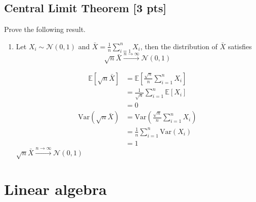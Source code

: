 \documentclass[a4paper]{article}
\theoremstyle{definition}
\newcommand{\Var}{\mathrm{Var}}
\newenvironment{soln}{
	\leavevmode\color{blue}\ignorespaces
}{}
\begin{document}
	\subsection{Central Limit Theorem [3 pts]}
	Prove the following result.
	\begin{enumerate}
		\item Let $X_i\sim\mathcal{N}(0, 1)$ and $\bar{X} = \frac{1}{n}\sum_{i=1}^n X_i$, then the distribution of $\bar{X}$ satisfies 
		$$\sqrt{n}\bar{X}\overset{n\rightarrow\infty}{\longrightarrow}\mathcal{N}(0, 1)$$
		
		\begin{soln}
			\begin{align*}
				\mathbb{E}[\sqrt{n}\bar{X}] &= \mathbb{E}[\frac{\sqrt{n}}{n}\sum_{i=1}^n X_i] \\
				&= \frac{1}{\sqrt{n}}\sum_{i=1}^n \mathbb{E}[X_i] \\
				&= 0
			\end{align*}
			\begin{align*}
				\Var(\sqrt{n}\bar{X}) &= \Var(\frac{\sqrt{n}}{n}\sum_{i=1}^n X_i) \\
				&= \frac{1}{n}\sum_{i=1}^n \Var(X_i) \\
				&= 1
			\end{align*}
			$\sqrt{n}\bar{X}\overset{n\rightarrow\infty}{\longrightarrow}\mathcal{N}(0, 1)$
		\end{soln}
		
	\end{enumerate}
	
	
	
	\section{Linear algebra}
	
	
\end{document}
